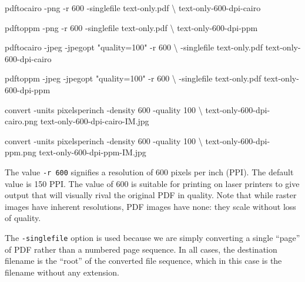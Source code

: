 \documentclass[
  11pt,
  british,
  a4paper,
]{article}
\newenvironment{Shaded}{\begin{snugshade}}{\end{snugshade}}
\newcommand{\AttributeTok}[1]{\textcolor[rgb]{0.80,0.80,0.80}{#1}}
\newcommand{\DataTypeTok}[1]{\textcolor[rgb]{0.87,0.87,0.75}{#1}}
\newcommand{\ExtensionTok}[1]{\textcolor[rgb]{0.80,0.80,0.80}{#1}}
\newcommand{\NormalTok}[1]{\textcolor[rgb]{0.80,0.80,0.80}{#1}}
\newcommand{\StringTok}[1]{\textcolor[rgb]{0.80,0.58,0.58}{#1}}
\begin{document}
\begin{Shaded}
\begin{Highlighting}[]
\ExtensionTok{pdftocairo} \AttributeTok{{-}png} \AttributeTok{{-}r}\NormalTok{ 600 }\AttributeTok{{-}singlefile}\NormalTok{ text{-}only.pdf }\DataTypeTok{\textbackslash{}}
\NormalTok{text{-}only{-}600{-}dpi{-}cairo}

\ExtensionTok{pdftoppm} \AttributeTok{{-}png} \AttributeTok{{-}r}\NormalTok{ 600 }\AttributeTok{{-}singlefile}\NormalTok{ text{-}only.pdf }\DataTypeTok{\textbackslash{}}
\NormalTok{text{-}only{-}600{-}dpi{-}ppm}

\ExtensionTok{pdftocairo} \AttributeTok{{-}jpeg} \AttributeTok{{-}jpegopt} \StringTok{"quality=100"} \AttributeTok{{-}r}\NormalTok{ 600 }\DataTypeTok{\textbackslash{}}
\NormalTok{{-}singlefile text{-}only.pdf text{-}only{-}600{-}dpi{-}cairo}

\ExtensionTok{pdftoppm} \AttributeTok{{-}jpeg} \AttributeTok{{-}jpegopt} \StringTok{"quality=100"} \AttributeTok{{-}r}\NormalTok{ 600 }\DataTypeTok{\textbackslash{}}
\NormalTok{{-}singlefile text{-}only.pdf text{-}only{-}600{-}dpi{-}ppm}

\ExtensionTok{convert} \AttributeTok{{-}units}\NormalTok{ pixelsperinch }\AttributeTok{{-}density}\NormalTok{ 600 }\AttributeTok{{-}quality}\NormalTok{ 100 }\DataTypeTok{\textbackslash{}}
\NormalTok{text{-}only{-}600{-}dpi{-}cairo.png text{-}only{-}600{-}dpi{-}cairo{-}IM.jpg}

\ExtensionTok{convert} \AttributeTok{{-}units}\NormalTok{ pixelsperinch }\AttributeTok{{-}density}\NormalTok{ 600 }\AttributeTok{{-}quality}\NormalTok{ 100 }\DataTypeTok{\textbackslash{}}
\NormalTok{text{-}only{-}600{-}dpi{-}ppm.png text{-}only{-}600{-}dpi{-}ppm{-}IM.jpg}
\end{Highlighting}
\end{Shaded}

The value \texttt{-r\ 600} signifies a resolution of 600 pixels per inch
(PPI). The default value is 150 PPI. The value of 600 is suitable for
printing on laser printers to give output that will visually rival the
original PDF in quality. Note that while raster images have inherent
resolutions, PDF images have none: they scale without loss of quality.

The \texttt{-singlefile} option is used because we are simply converting
a single ``page'' of PDF rather than a numbered page sequence. In all
cases, the destination filename is the ``root'' of the converted file
sequence, which in this case is the filename without any extension.
\end{document}

